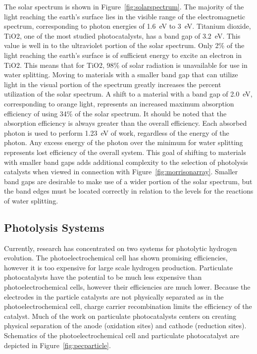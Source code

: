 \documentclass[12pt,%
              twoside,
               letterpaper]{uiothesis}
\begin{document}
The solar spectrum is shown in Figure~\ref{fig:solarspectrum}. The majority of the light
reaching the earth's surface lies in the visible range of the electromagnetic spectrum,
corresponding to photon energies of 1.6~eV to 3~eV. Titanium dioxide, TiO2, one of
the most studied photocatalysts, has a band gap of 3.2~eV. This value is well in to the
ultraviolet portion of the solar spectrum. Only 2\% of the light reaching the earth's
surface is of sufficient energy to excite an electron in TiO2. This means that for
TiO2, 98\% of solar radiation is unavailable for use in water splitting. Moving to
materials with a smaller band gap that can utilize light in the visual portion of the
spectrum greatly increases the percent utilization of the solar spectrum. A shift to a
material with a band gap of 2.0~eV, corresponding to orange light, represents an increased
maximum absorption efficiency of using 34\% of the solar spectrum. It should be noted that
the absorption efficiency is always greater than the overall efficiency. Each absorbed
photon is used to perform 1.23~eV of work, regardless of the energy of the photon. Any
excess energy of the photon over the minimum for water splitting represents lost
efficiency of the overall system. This goal of shifting to materials with smaller band
gaps adds additional complexity to the selection of photolysis catalysts when viewed in
connection with Figure~\ref{fig:morrisonarray}. Smaller band gaps are desirable to make use of
a wider portion of the solar spectrum, but the band edges must be located correctly in
relation to the levels for the reactions of water splitting.

\subsection{Photolysis Systems}
\label{subsec:background.systems}

Currently, research has concentrated on two systems for photolytic hydrogen evolution. The
photoelectrochemical cell has shown promising
efficiencies,\cite{Fujishima:1972hc,User:2001tg} however it is too expensive for large
scale hydrogen production. Particulate photocatalysts have the potential to be much less
expensive than photoelectrochemical cells, however their efficiencies are much lower.
\cite{Kaneko:2002vh} Because the electrodes in the particle catalysts are not physically
separated as in the photoelectrochemical cell, charge carrier recombination limits the
efficiency of the catalyst. Much of the work on particulate photocatalysts centers on
creating physical separation of the anode (oxidation sites) and cathode (reduction
sites).\cite{Kitano:2008io,Kudo:2008fk} Schematics of the photoelectrochemical cell and
particulate photocatalyst are depicted in Figure~\ref{fig:pecparticle}.
\end{document}

